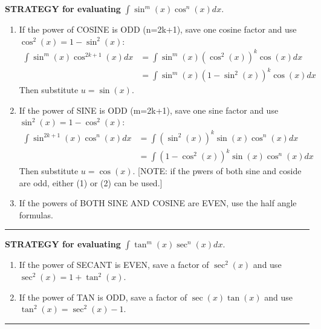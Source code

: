 \documentclass[reqno]{amsart}
\numberwithin{equation}{section}
\begin{document}
\pagebreak
\begin{center}
{\bf STRATEGY for evaluating} $ \int \sin^m(x) \cos^n(x) dx$.
\begin{enumerate}
\item  If the power of COSINE is ODD (n=2k+1), save one cosine factor and use $\cos^2(x)=1-\sin^2(x)$:
\begin{align*}
\int \sin^m(x) \cos^{2k+1}(x) dx &= \int \sin^m(x) (\cos^{2}(x))^k \cos(x) dx \\
&= \int \sin^m(x) (1-\sin^{2}(x))^k  \cos(x) dx 
\end{align*}
Then substitute $u=\sin(x)$.
\item If the power of SINE is ODD (m=2k+1), save one sine factor and use $\sin^2(x)=1-\cos^2(x)$:
\begin{align*}
\int \sin^{2k+1}(x) \cos^n(x) dx &= \int (\sin^{2}(x))^k\sin(x)\cos^n(x) dx \\
&=  \int (1-\cos^{2}(x))^k\sin(x)\cos^n(x) dx 
\end{align*}
Then substitute $u=\cos(x)$. [NOTE: if the pwers of both sine and coside are odd, either (1) or (2) can be used.]
\item If the powers of BOTH SINE AND COSINE are EVEN, use the half angle formulas.
\end{enumerate}
\end{center}

\hrule
\vspace{3pc}

\begin{center}
{\bf STRATEGY for evaluating} $ \int \tan^m(x) \sec^n(x) dx$.
\begin{enumerate}
\item  If the power of SECANT is EVEN, save a factor of $\sec^2(x)$ and use $\sec^2(x)=1+\tan^2(x)$.
\item If the power of TAN is ODD, save a factor of $\sec(x)\tan(x)$ and use $\tan^2(x)=\sec^2(x)-1$.
\end{enumerate}
\end{center}

\hrule 
\end{document}
